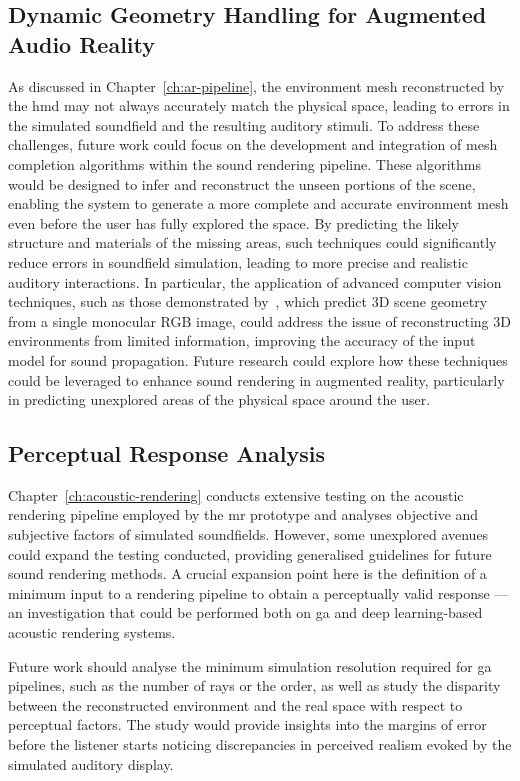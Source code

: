\subsection{Dynamic Geometry Handling for Augmented Audio Reality}
As discussed in Chapter~\ref{ch:ar-pipeline}, the environment mesh reconstructed by the \acrshort{hmd} may not always accurately match the physical space, leading to errors in the simulated soundfield and the resulting auditory stimuli. To address these challenges, future work could focus on the development and integration of mesh completion algorithms within the sound rendering pipeline. These algorithms would be designed to infer and reconstruct the unseen portions of the scene, enabling the system to generate a more complete and accurate environment mesh even before the user has fully explored the space. By predicting the likely structure and materials of the missing areas, such techniques could significantly reduce errors in soundfield simulation, leading to more precise and realistic auditory interactions.
In particular, the application of advanced computer vision techniques, such as those demonstrated by~\cite{cao2022monoscene}, which predict 3D scene geometry from a single monocular RGB image, could address the issue of reconstructing 3D environments from limited information, improving the accuracy of the input model for sound propagation. Future research could explore how these techniques could be leveraged to enhance sound rendering in augmented reality, particularly in predicting unexplored areas of the physical space around the user.

\subsection{Perceptual Response Analysis}
Chapter~\ref{ch:acoustic-rendering} conducts extensive testing on the acoustic rendering pipeline employed by the \acrshort{mr} prototype and analyses objective and subjective factors of simulated soundfields. However, some unexplored avenues could expand the testing conducted, providing generalised guidelines for future sound rendering methods. A crucial expansion point here is the definition of a minimum input to a rendering pipeline to obtain a perceptually valid response --- an investigation that could be performed both on \acrshort{ga} and deep learning-based acoustic rendering systems.\par
Future work should analyse the minimum simulation resolution required for \acrshort{ga} pipelines, such as the number of rays or the order, as well as study the disparity between the reconstructed environment and the real space with respect to perceptual factors. The study would provide insights into the margins of error before the listener starts noticing discrepancies in perceived realism evoked by the simulated auditory display.\par


